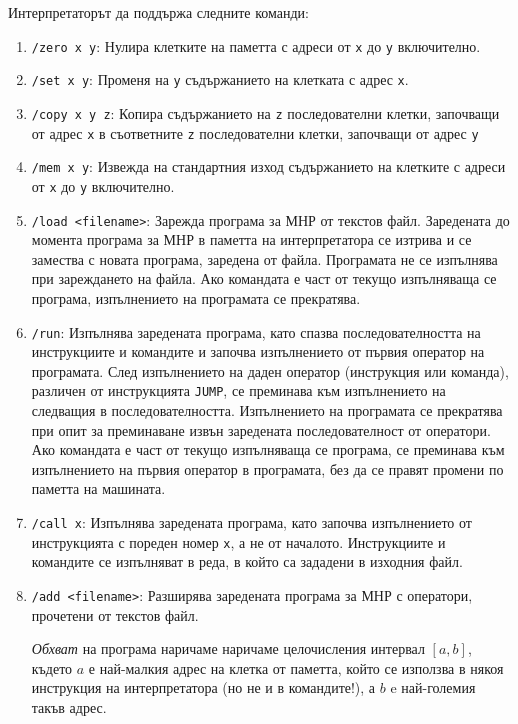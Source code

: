 \documentclass[12pt,a4paper]{article}
\newcommand{\code}[1]{\texttt{#1}}
\begin{document}
{Интерпретаторът да поддържа следните команди:

\begin{enumerate}
    \item \code{/zero x y}: Нулира клетките на паметта с адреси от \code{x} до \code{y} включително.
    \item \code{/set x y}: Променя на \code{y} съдържанието на клетката с адрес \code{x}.
    \item \code{/copy x y z}: Копира съдържанието на \code{z} последователни клетки, започващи от адрес \code{x} в съответните \code{z} последователни клетки, започващи от адрес \code{y} 
    \item \code{/mem x y}: Извежда на стандартния изход съдържанието на клетките с адреси от \code{x} до \code{y} включително.
    \item \code{/load <filename>}: Зарежда програма за МНР от текстов файл. Заредената до момента програма за МНР в паметта на интерпретатора се изтрива и се замества с новата програма, заредена от файла. Програмата не се изпълнява при зареждането на файла. Ако командата е част от текущо изпълняваща се програма, изпълнението на програмата се прекратява.
    \item \code{/run}: Изпълнява заредената програма, като спазва последователността на инструкциите и командите и започва изпълнението от първия оператор на програмата. След изпълнението на даден оператор (инструкция или команда), различен от инструкцията \code{JUMP}, се преминава към изпълнението на следващия в последователността. Изпълнението на програмата се прекратява при опит за преминаване извън заредената последователност от оператори. Ако командата е част от текущо изпълняваща се програма, се преминава към изпълнението на първия оператор в програмата, без да се правят промени по паметта на машината.
    \item \code{/call x}: Изпълнява заредената програма, като започва изпълнението от инструкцията с пореден номер \code{x}, а не от началото. Инструкциите и командите се изпълняват в реда, в който са зададени в изходния файл.
    \item \code{/add <filename>}: Разширява заредената програма за МНР с оператори, прочетени от текстов файл.

    \emph{Обхват} на програма наричаме наричаме целочисления интервал $[a,b]$, където $a$ е най-малкия адрес на клетка от паметта, който се използва в някоя инструкция на интерпретатора (но не и в командите!), а $b$ e най-големия такъв адрес.


\end{enumerate}}
\end{document}
